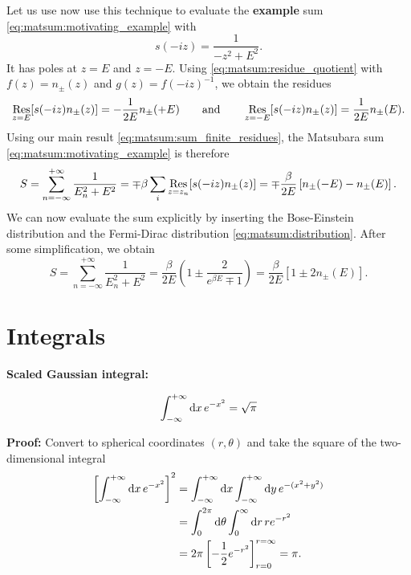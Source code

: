 Let us use now use this technique to evaluate the \textbf{example} sum \eqref{eq:matsum:motivating_example} with
\begin{equation}
	s(-iz) = \frac{1}{-z^2 + E^2} .
\end{equation}
It has poles at $z = E$ and $z = -E$.
Using \cref{eq:matsum:residue_quotient} with $f(z) = n_\pm(z)$ and $g(z) = f(-iz)^{-1}$, we obtain the residues
\begin{equation}
	\operatorname*{Res}_{z =  E}[s(-iz) n_\pm(z)] = -\frac{1}{2 E} n_\pm(+E) 
	\qquad \text{and} \qquad
	\operatorname*{Res}_{z = -E}[s(-iz) n_\pm(z)] =  \frac{1}{2 E} n_\pm( E) .
\end{equation}
Using our main result \eqref{eq:matsum:sum_finite_residues}, the Matsubara sum \eqref{eq:matsum:motivating_example} is therefore
\begin{equation}
	S = \sum_{n=-\infty}^{+\infty} \frac{1}{E_n^2 + E^2}
	  = \mp \beta \sum_i \operatorname*{Res}_{z=z_n}[s(-i z) n_\pm(z)]
	  = \mp \frac{\beta}{2 E} \left[ n_\pm(-E) - n_\pm(E) \right] .
\end{equation}
We can now evaluate the sum explicitly by inserting the Bose-Einstein distribution and the Fermi-Dirac distribution \eqref{eq:matsum:distribution}.
After some simplification, we obtain
\begin{equation}
	S = \sum_{n=-\infty}^{+\infty} \frac{1}{E_n^2 + E^2}
	  = \frac{\beta}{2 E} \left( 1 \pm \frac{2}{e^{\beta E} \mp 1} \right)
	  = \frac{\beta}{2 E} \left[ 1 \pm 2 n_\pm(E) \right] .
\label{eq:matsum:example_result}
\end{equation}

\chapter{Integrals}

\newcommand\formulawithcomment[4]{%
\textbf{#1:}
#2
\textbf{#3:} #4
}

\newcommand\formulawithproof[3]{\formulawithcomment{#1}{#2}{Proof}{#3}}
\newcommand\formulawithreference[3]{\formulawithcomment{#1}{#2}{Reference}{#3}}

\formulawithproof{Scaled Gaussian integral}{
	\begin{equation}
		\int_{-\infty}^{+\infty} \mathop{}\!\mathrm{d} x \, e^{-x^2} = \sqrt{\pi}
	\label{eq:integrals:gaussian_sqrtpi}
	\end{equation}
}{
	Convert to spherical coordinates $(r, \theta)$ and take the square of the two-dimensional integral
	\begin{equation}
	\begin{split}
			\left[ \int_{-\infty}^{+\infty} \mathop{}\!\mathrm{d} x \, e^{-x^2} \right]^2 &= \int_{-\infty}^{+\infty} \mathop{}\!\mathrm{d} x \int_{-\infty}^{+\infty} \mathop{}\!\mathrm{d} y \, e^{-(x^2 + y^2)} \\
		                                                             &= \int_{0}^{2 \pi} \mathop{}\!\mathrm{d} \theta \int_{0}^{\infty} \mathop{}\!\mathrm{d} r \, r e^{-r^2} \\
																	 &= 2 \pi \left[ -\frac12 e^{-r^2} \right]_{r=0}^{r=\infty} = \pi . \\
	\end{split}
	\end{equation}
}

